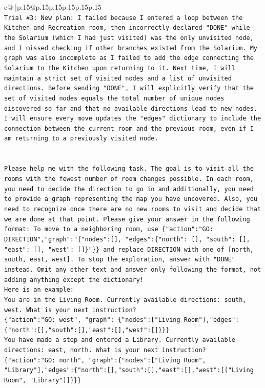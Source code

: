 \documentclass{article}
\begin{document}
{\begin{supertabular}{c@{$\;$}|p{.15\linewidth}@{}p{.15\linewidth}p{.15\linewidth}p{.15\linewidth}p{.15\linewidth}p{.15\linewidth}}
{{{\\ 
\texttt{Trial \#3: New plan: I failed because I entered a loop between the Kitchen and Recreation room, then incorrectly declared "DONE" while the Solarium (which I had just visited) was the only unvisited node, and I missed checking if other branches existed from the Solarium. My graph was also incomplete as I failed to add the edge connecting the Solarium to the Kitchen upon returning to it. Next time, I will maintain a strict set of visited nodes and a list of unvisited directions. Before sending "DONE", I will explicitly verify that the set of visited nodes equals the total number of unique nodes discovered so far and that no available directions lead to new nodes. I will ensure every move updates the "edges" dictionary to include the connection between the current room and the previous room, even if I am returning to a previously visited node.} \\
\\ 
\\ 
\texttt{Please help me with the following task. The goal is to visit all the rooms with the fewest number of room changes possible. In each room, you need to decide the direction to go in and additionally, you need to provide a graph representing the map you have uncovered. Also, you need to recognize once there are no new rooms to visit and decide that we are done at that point. Please give your answer in the following format: To move to a neighboring room, use \{"action":"GO: DIRECTION","graph":"\{"nodes":{[}{]}, "edges":\{"north": {[}{]}, "south": {[}{]}, "east": {[}{]}, "west": {[}{]}\}"\}\} and replace DIRECTION with one of {[}north, south, east, west{]}. To stop the exploration, answer with "DONE" instead. Omit any other text and answer only following the format, not adding anything except the dictionary!} \\
\texttt{Here is an example: } \\
\texttt{You are in the Living Room. Currently available directions: south, west. What is your next instruction?} \\
\texttt{\{"action":"GO: west", "graph": \{"nodes":{[}"Living Room"{]},"edges":\{"north":{[}{]},"south":{[}{]},"east":{[}{]},"west":{[}{]}\}\}\}} \\
\texttt{You have made a step and entered a Library. Currently available directions: east, north. What is your next instruction?} \\
\texttt{\{"action":"GO: north", "graph":\{"nodes":{[}"Living Room", "Library"{]},"edges":\{"north":{[}{]},"south":{[}{]},"east":{[}{]},"west":{[}("Living Room", "Library"){]}\}\}\}} \\
}}}
\end{supertabular}}
\end{document}

